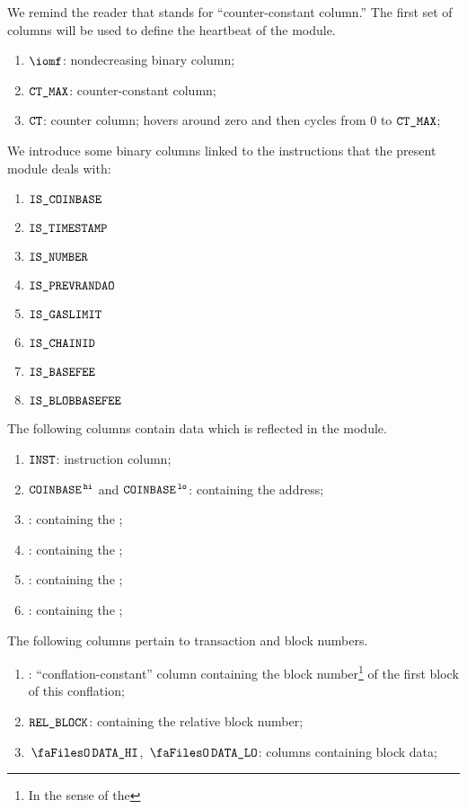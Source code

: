 We remind the reader that \ccc{} stands for ``counter-constant column.''
The first set of columns will be used to define the heartbeat of the \btcMod{} module.
\begin{enumerate}
	\item $\iomf$:
		nondecreasing binary column;
	\item $\texttt{CT\_MAX}$:
		counter-constant column;
	\item $\texttt{CT}$:
		counter column; hovers around zero and then cycles from $0$ to $\texttt{CT\_MAX}$;
\end{enumerate}
We introduce some binary columns linked to the instructions that the present module deals with:
\begin{multicols}{3}
	\begin{enumerate}[resume]
		\item $\texttt{IS\_COINBASE}$
		\item $\texttt{IS\_TIMESTAMP}$
		\item $\texttt{IS\_NUMBER}$
		\item $\texttt{IS\_PREVRANDAO}$
		\item $\texttt{IS\_GASLIMIT}$
		\item $\texttt{IS\_CHAINID}$
		\item $\texttt{IS\_BASEFEE}$
		\item $\texttt{IS\_BLOBBASEFEE}$
	\end{enumerate}
\end{multicols}
\noindent The following columns contain data which is reflected in the \userTxnDataMod{} module.
\begin{enumerate}[resume, start=13]
	\item $\texttt{INST}$:
		instruction column;
	\item $\texttt{COINBASE}^{\mathtt{\,hi}}$ and $\texttt{COINBASE}^{\mathtt{\,lo}}$:
		\ccc{} containing the
		\coinbaseName{} address;
	\item \blockGasLimit{}:
		\ccc{} containing the
		\blockGasLimitName{};
	\item \basefee{}:
		\ccc{} containing the
		\basefee{};
	\item \timestamp{}:
		\ccc{} containing the
		\timestamp{};
	\item \numberr{}:
		\ccc{} containing the
		\numberr{};
\end{enumerate}
The following columns pertain to transaction and block numbers.
\begin{enumerate}[resume]
	\item \blockNumberOfFirstBlockInConflation{}:
		``conflation-constant'' column containing the block number\footnote{In the sense of the \evm{}} of the first block of this conflation;
	\item $\texttt{REL\_BLOCK}$:
		\ccc{} containing the relative block number;
	\item $\blockDataHi$, $\blockDataLo$:
		columns containing block data;
\end{enumerate}
